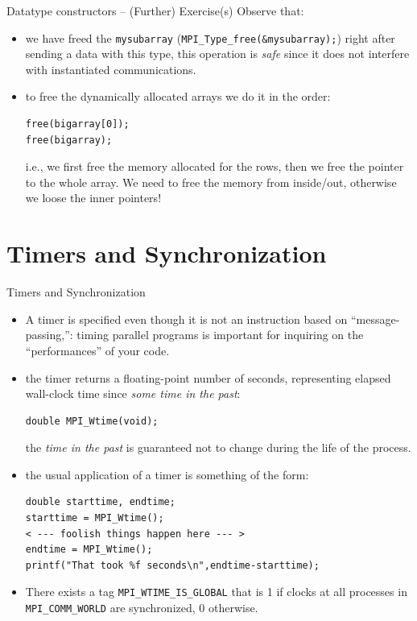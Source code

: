 \documentclass[xcolor={svgnames,usenames}]{beamer}
\begin{document}
\begin{frame}[fragile]{Datatype constructors -- (Further) Exercise(s)}
Observe that:
\begin{itemize}
	\item we have freed the \texttt{mysubarray} (\texttt{MPI_Type_free(&mysubarray);}) right after sending a data with this type, this operation is \emph{safe} since it does not interfere with instantiated communications.
	\item to free the dynamically allocated arrays we do it in the order:
\begin{verbatim}
free(bigarray[0]);
free(bigarray);
\end{verbatim}
	i.e., we first free the memory allocated for the rows, then we free the pointer to the whole array. We need to free the memory from inside/out, otherwise we loose the inner pointers!
\end{itemize}

\end{frame}

\section{Timers and Synchronization}

\begin{frame}[fragile]{Timers and Synchronization}
\begin{itemize}
	\item<1-> A timer is specified even though it is not an instruction based on ``message-passing,'': timing parallel programs is important for inquiring on the ``performances'' of your code.
	\item<2-> the timer returns a floating-point number of seconds, representing elapsed wall-clock time since \emph{some time in the past}:
\begin{verbatim}
double MPI_Wtime(void);
\end{verbatim}
	the \emph{time in the past} is guaranteed not to change during the life of the process.
	\item<3-> the usual application of a timer is something of the form:
\begin{verbatim}
double starttime, endtime;
starttime = MPI_Wtime();
< --- foolish things happen here --- >
endtime = MPI_Wtime();
printf("That took %f seconds\n",endtime-starttime);
\end{verbatim}
\item<4-> There exists a tag \texttt{MPI_WTIME_IS_GLOBAL} that is 1 if clocks at all processes in \texttt{MPI_COMM_WORLD} are synchronized, 0 otherwise.
\end{itemize}
\end{frame}
\end{document}
